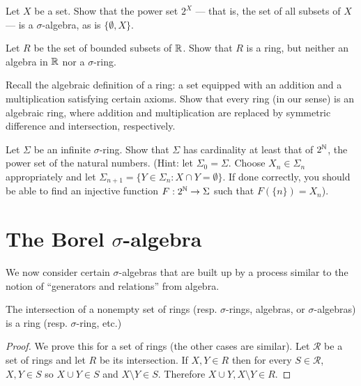 \begin{exercise}
Let $X$ be a set.
Show that the power set $2^X$ --- that is, the set of all subsets of $X$ --- is a $\sigma$-algebra, as is $\{\emptyset, X\}$.
\end{exercise}

\begin{exercise}
Let $R$ be the set of bounded subsets of $\mathbb{R}$.
Show that $R$ is a ring, but neither an algebra in $\mathbb{R}$ nor a $\sigma$-ring.
\end{exercise}

\begin{exercise}
Recall the algebraic definition of a ring: a set equipped with an addition and a multiplication satisfying certain axioms.
Show that every ring (in our sense) is an algebraic ring, where addition and multiplication are replaced by symmetric difference and intersection, respectively.
\end{exercise}

\begin{exercise}
Let $\Sigma$ be an infinite $\sigma$-ring. Show that $\Sigma$ has cardinality at least that of $2^{\mathbb{N}}$, the power set of the natural numbers.
(Hint: let $\Sigma_0 = \Sigma$. Choose $X_{n} \in \Sigma_{n}$ appropriately and let $\Sigma_{n+1} = \{Y \in \Sigma_{n}: X \cap Y = \emptyset\}$. If done correctly, you should be able to find an injective function $F: 2^{\mathbb{N}} \to \Sigma$ such that $F(\{n\}) = X_{n}$).
\end{exercise}

\section{The Borel $\sigma$-algebra}
We now consider certain $\sigma$-algebras that are built up by a process similar to the notion of ``generators and relations'' from algebra.

\begin{lemma}\label{intersection of rings is ring}
The intersection of a nonempty set of rings (resp. $\sigma$-rings, algebras, or $\sigma$-algebras) is a ring (resp. $\sigma$-ring, etc.)
\end{lemma}
\begin{proof}
We prove this for a set of rings (the other cases are similar). Let $\mathcal R$ be a set of rings and let $R$ be its intersection.
If $X, Y \in R$ then for every $S \in \mathcal R$, $X, Y \in S$ so $X \cup Y \in S$ and $X \setminus Y \in S$.
Therefore $X \cup Y, X \setminus Y \in R$.
\end{proof}

